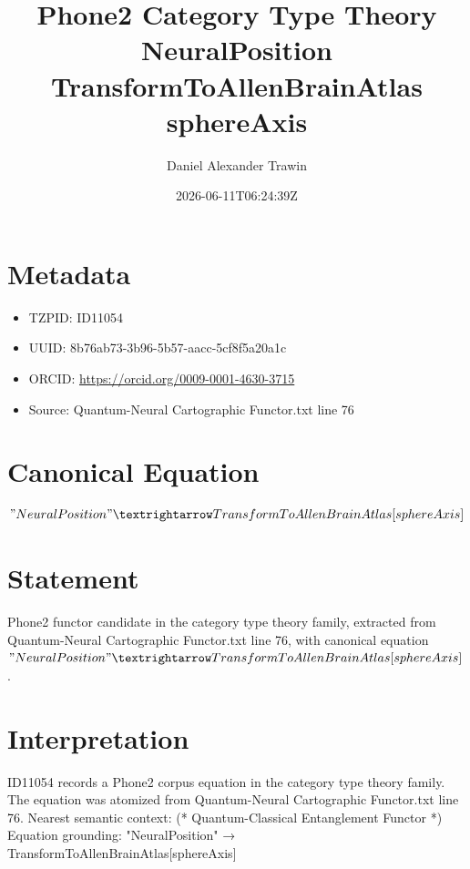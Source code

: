\documentclass[11pt]{article}
\title{Phone2 Category Type Theory NeuralPosition TransformToAllenBrainAtlas sphereAxis}
\author{Daniel Alexander Trawin}
\date{2026-06-11T06:24:39Z}
\begin{document}
\maketitle
\section*{Metadata}
\begin{itemize}
\item TZPID: ID11054
\item UUID: 8b76ab73-3b96-5b57-aacc-5cf8f5a20a1c
\item ORCID: \url{https://orcid.org/0009-0001-4630-3715}
\item Source: Quantum-Neural Cartographic Functor.txt line 76
\end{itemize}
\section*{Canonical Equation}
\[
"NeuralPosition" → TransformToAllenBrainAtlas[sphereAxis]
\]
\section*{Statement}
Phone2 functor candidate in the category type theory family, extracted from Quantum-Neural Cartographic Functor.txt line 76, with canonical equation $"NeuralPosition" → TransformToAllenBrainAtlas[sphereAxis]$.
\section*{Interpretation}
ID11054 records a Phone2 corpus equation in the category type theory family. The equation was atomized from Quantum-Neural Cartographic Functor.txt line 76. Nearest semantic context: (* Quantum-Classical Entanglement Functor *) Equation grounding: "NeuralPosition" → TransformToAllenBrainAtlas[sphereAxis]
\end{document}
